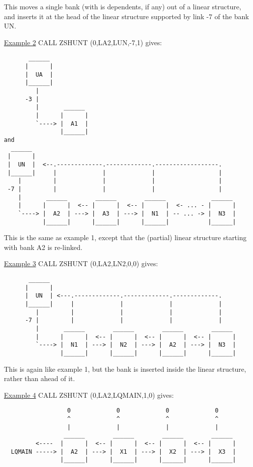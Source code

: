 This moves a single bank (with is dependents, if any) out of
a linear structure, and inserts it at the head of the linear
structure supported by link -7 of the bank UN.

\vspace{4mm}
\ul{Example 2} \hspace{12mm} CALL ZSHUNT (0,LA2,LUN,-7,1)   \hspace{5mm} gives:
\begin{verbatim}
       ______
      |      |
      |  UA  |
      |______|
         |
      -3 |
         |       ______
         |      |      |
         `----> |  A1  |
                |______|
and
  ______
 |      |
 |  UN  |  <--.-------------.-------------.------------------.
 |______|     |             |             |                  |
    |         |             |             |                  |
 -7 |         |             |             |                  |
    |       ______        ______        ______             ______
    |      |      |  <-- |      |  <-- |      |  <- ... - |      |
    `----> |  A2  | ---> |  A3  | ---> |  N1  | -- ... -> |  N3  |
           |______|      |______|      |______|           |______|
\end{verbatim} 
This is the same as example 1, except that the (partial) linear
structure starting with bank A2 is re-linked.


\ul{Example 3} \hspace{12mm} CALL ZSHUNT (0,LA2,LN2,0,0)    \hspace{5mm} gives:
\begin{verbatim}
       ______
      |      |
      |  UN  | <---.-------------.-------------.-------------.
      |______|     |             |             |             |
         |         |             |             |             |
      -7 |         |             |             |             |
         |       ______        ______        ______        ______
         |      |      |  <-- |      |  <-- |      |  <-- |      |
         `----> |  N1  | ---> |  N2  | ---> |  A2  | ---> |  N3  |
                |______|      |______|      |______|      |______|
\end{verbatim} 
This is again like example 1, but the bank is inserted inside
the linear structure, rather than ahead of it.

\vspace{4mm}
\ul{Example 4} \hspace{12mm} CALL ZSHUNT (0,LA2,LQMAIN,1,0) \hspace{5mm} gives:
\begin{verbatim}
                  0             0             0             0
                  ^             ^             ^             ^
                  |             |             |             |
                 ______        ______        ______        ______
         <----  |      |  <-- |      |  <-- |      |  <-- |      |
  LQMAIN -----> |  A2  | ---> |  X1  | ---> |  X2  | ---> |  X3  |
                |______|      |______|      |______|      |______|
\end{verbatim} 

